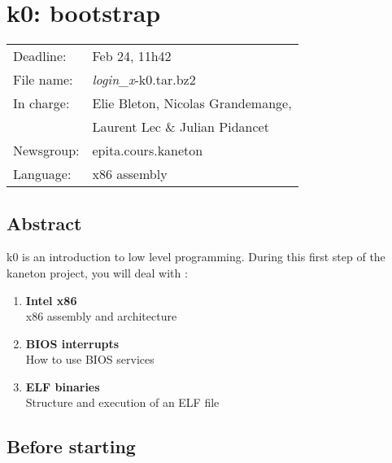 
%
%

\chapter{k0: bootstrap}

%
%

\begin{tabular}{p{7cm}l}
Deadline: & Feb 24, 11h42 \\
File name: & {\em login\_x}-k0.tar.bz2 \\
In charge: & Elie Bleton, Nicolas Grandemange,\\
        & Laurent Lec \& Julian Pidancet\\
Newsgroup: & epita.cours.kaneton\\
Language: & x86 assembly\\
\end{tabular}

\section{Abstract}

k0 is an introduction to low level programming. During this first step of
the kaneton project, you will deal with :

\begin{enumerate}
  \item
    {\bf Intel x86}\\
    x86 assembly and architecture\\
  \item
    {\bf BIOS interrupts}\\
    How to use BIOS services\\
  \item
    {\bf ELF binaries}\\
    Structure and execution of an ELF file\\
\end{enumerate}

\clearpage

\section{Before starting}

